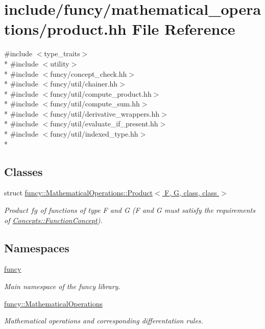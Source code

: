 \hypertarget{product_8hh}{\section{include/funcy/mathematical\-\_\-operations/product.hh File Reference}
\label{product_8hh}
}
{\ttfamily \#include $<$type\-\_\-traits$>$}\\*
{\ttfamily \#include $<$utility$>$}\\*
{\ttfamily \#include $<$funcy/concept\-\_\-check.\-hh$>$}\\*
{\ttfamily \#include $<$funcy/util/chainer.\-hh$>$}\\*
{\ttfamily \#include $<$funcy/util/compute\-\_\-product.\-hh$>$}\\*
{\ttfamily \#include $<$funcy/util/compute\-\_\-sum.\-hh$>$}\\*
{\ttfamily \#include $<$funcy/util/derivative\-\_\-wrappers.\-hh$>$}\\*
{\ttfamily \#include $<$funcy/util/evaluate\-\_\-if\-\_\-present.\-hh$>$}\\*
{\ttfamily \#include $<$funcy/util/indexed\-\_\-type.\-hh$>$}\\*
\subsection*{Classes}
\begin{DoxyCompactItemize}
\item 
struct \hyperlink{structfuncy_1_1MathematicalOperations_1_1Product}{funcy\-::\-Mathematical\-Operations\-::\-Product$<$ F, G, class, class $>$}
\begin{DoxyCompactList}\small\item\em Product $fg$ of functions of type F and G (F and G must satisfy the requirements of \hyperlink{structfuncy_1_1Concepts_1_1FunctionConcept}{Concepts\-::\-Function\-Concept}). \end{DoxyCompactList}\end{DoxyCompactItemize}
\subsection*{Namespaces}
\begin{DoxyCompactItemize}
\item 
\hyperlink{namespacefuncy}{funcy}
\begin{DoxyCompactList}\small\item\em Main namespace of the funcy library. \end{DoxyCompactList}\item 
\hyperlink{namespacefuncy_1_1MathematicalOperations}{funcy\-::\-Mathematical\-Operations}
\begin{DoxyCompactList}\small\item\em Mathematical operations and corresponding differentation rules. \end{DoxyCompactList}\end{DoxyCompactItemize}
